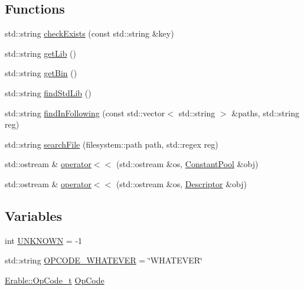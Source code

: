 \subsection*{Functions}
\begin{DoxyCompactItemize}
\item 
std\+::string \mbox{\hyperlink{namespace_erable_a9ac51d513b3b6629dcde72f4bf50dce2}{check\+Exists}} (const std\+::string \&key)
\item 
std\+::string \mbox{\hyperlink{namespace_erable_ae9dba4ed847d7fbcf9fc1f437578ef91}{get\+Lib}} ()
\item 
std\+::string \mbox{\hyperlink{namespace_erable_a55a887a018ba68ab971e3711a638dfa1}{get\+Bin}} ()
\item 
std\+::string \mbox{\hyperlink{namespace_erable_a88ace7b6867a84bf35b98b063516dd06}{find\+Std\+Lib}} ()
\item 
std\+::string \mbox{\hyperlink{namespace_erable_afa01b2a2d08571557c8442da41cb72ec}{find\+In\+Following}} (const std\+::vector$<$ std\+::string $>$ \&paths, std\+::string reg)
\item 
std\+::string \mbox{\hyperlink{namespace_erable_a74b626ab901e5877e4c3af2645d10da7}{search\+File}} (filesystem\+::path path, std\+::regex reg)
\item 
std\+::ostream \& \mbox{\hyperlink{namespace_erable_a248ccc14098f3d28bd8c59ac41eeee0f}{operator$<$$<$}} (std\+::ostream \&os, \mbox{\hyperlink{class_erable_1_1_constant_pool}{Constant\+Pool}} \&obj)
\item 
std\+::ostream \& \mbox{\hyperlink{namespace_erable_ad7b7bf528e735eaad7f3d472002b1f74}{operator$<$$<$}} (std\+::ostream \&os, \mbox{\hyperlink{class_erable_1_1_descriptor}{Descriptor}} \&obj)
\end{DoxyCompactItemize}
\subsection*{Variables}
\begin{DoxyCompactItemize}
\item 
int \mbox{\hyperlink{namespace_erable_a6d9e1e498f68cd7fa1c71cb362c89333}{U\+N\+K\+N\+O\+WN}} = -\/1
\item 
std\+::string \mbox{\hyperlink{namespace_erable_a60c921f1f338c12555495547451795f3}{O\+P\+C\+O\+D\+E\+\_\+\+W\+H\+A\+T\+E\+V\+ER}} = \char`\"{}W\+H\+A\+T\+E\+V\+ER\char`\"{}
\item 
\mbox{\hyperlink{class_erable_1_1_op_code__t}{Erable\+::\+Op\+Code\+\_\+t}} \mbox{\hyperlink{namespace_erable_adf78214f7408cc5507bb91e4e022379c}{Op\+Code}}
\end{DoxyCompactItemize}


